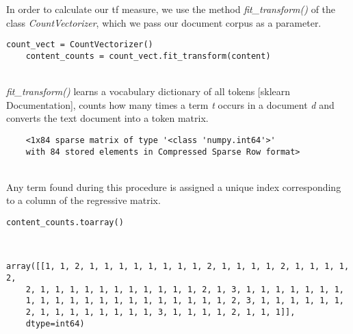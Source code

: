 \documentclass[a4paper, 11pt,titlepage,oneside,openany]{book}
\begin{document}
\noindent In order to calculate our \gls{tf} measure, we use the method \textit{fit\_transform()} of the class \textit{CountVectorizer}, which we pass our document corpus as a parameter. \\
\noindent
\begin{minipage}{\linewidth}
	\begin{lstlisting}[frame=single]
	count_vect = CountVectorizer()
	content_counts = count_vect.fit_transform(content)
	\end{lstlisting}
\end{minipage} \\
\noindent \textit{fit\_transform()} learns a vocabulary dictionary of all tokens [sklearn Documentation], counts how many times a term \textit{t} occurs in a document \textit{d} and converts the text document into a token matrix. \\
\noindent
\begin{minipage}{\linewidth}
	\begin{lstlisting}
	<1x84 sparse matrix of type '<class 'numpy.int64'>'
	with 84 stored elements in Compressed Sparse Row format>
	\end{lstlisting}
\end{minipage} \\
\noindent Any term found during this procedure is assigned a unique index corresponding to a column of the regressive matrix.\\
\noindent
\begin{minipage}{\linewidth}
	\begin{lstlisting}[frame=single]
	content_counts.toarray()
	\end{lstlisting}
\end{minipage} \\
\noindent
\begin{minipage}{\linewidth}
	\begin{lstlisting}
array([[1, 1, 2, 1, 1, 1, 1, 1, 1, 1, 1, 2, 1, 1, 1, 1, 2, 1, 1, 1, 1, 2,
	2, 1, 1, 1, 1, 1, 1, 1, 1, 1, 1, 1, 2, 1, 3, 1, 1, 1, 1, 1, 1, 1,
	1, 1, 1, 1, 1, 1, 1, 1, 1, 1, 1, 1, 1, 1, 2, 3, 1, 1, 1, 1, 1, 1,
	2, 1, 1, 1, 1, 1, 1, 1, 1, 3, 1, 1, 1, 1, 2, 1, 1, 1]],
	dtype=int64)
	\end{lstlisting}
\end{minipage} \\
\end{document}
